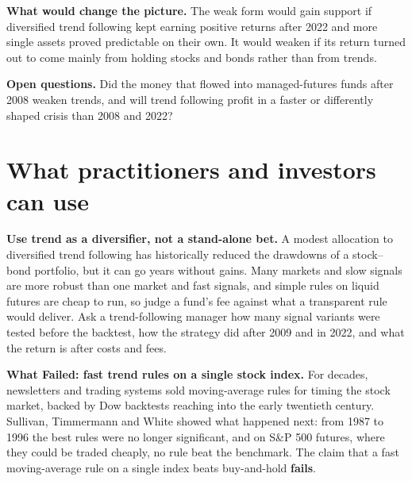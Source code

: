 \textbf{What would change the picture.} The weak form would gain support if diversified trend following kept earning positive returns after 2022 and more single assets proved predictable on their own. It would weaken if its return turned out to come mainly from holding stocks and bonds rather than from trends.

\label{sec:08-open}
\textbf{Open questions.} Did the money that flowed into managed-futures funds after 2008 weaken trends, and will trend following profit in a faster or differently shaped crisis than 2008 and 2022?

\section{What practitioners and investors can use}
\label{sec:08-investors}

\textbf{Use trend as a diversifier, not a stand-alone bet.} A modest allocation to diversified trend following has historically reduced the drawdowns of a stock--bond portfolio, but it can go years without gains. Many markets and slow signals are more robust than one market and fast signals, and simple rules on liquid futures are cheap to run, so judge a fund's fee against what a transparent rule would deliver. Ask a trend-following manager how many signal variants were tested before the backtest, how the strategy did after 2009 and in 2022, and what the return is after costs and fees.

\begin{callout}
\textbf{What Failed: fast trend rules on a single stock index.} For decades, newsletters and trading systems sold moving-average rules for timing the stock market, backed by Dow backtests reaching into the early twentieth century. Sullivan, Timmermann and White showed what happened next: from 1987 to 1996 the best rules were no longer significant, and on S\&P 500 futures, where they could be traded cheaply, no rule beat the benchmark. The claim that a fast moving-average rule on a single index beats buy-and-hold \textbf{fails}.
\end{callout}
